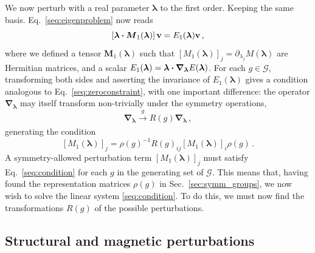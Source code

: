 We now perturb with a real parameter $\boldsymbol{\lambda}$ to the first order. Keeping the same basis. Eq.~\eqref{seq:eigenproblem} now reads
\begin{equation} \label{seq:perteq}
\left[\boldsymbol{\lambda} \vdot \boldsymbol{M}_{1}(\boldsymbol{\lambda})\right] \vb{v} = E_1(\boldsymbol{\lambda}) \vb{v}\,,
\end{equation}
where we defined a tensor $\boldsymbol{M}_{1}(\boldsymbol{\lambda})$ such that $\left[M_1(\boldsymbol{\lambda})\right]_j = \partial_{\lambda_j} M(\boldsymbol{\lambda} )$ are Hermitian matrices, and a scalar $E_{1}(\boldsymbol{\lambda}) = \boldsymbol{\lambda} \vdot \boldsymbol{\nabla_\lambda} E(\boldsymbol{\lambda} )$. 
For each $g \in \mathcal{G}$, transforming both sides and asserting the invariance of $E_1(\boldsymbol{\lambda})$ gives a condition analogous to Eq.~\eqref{seq:zeroconstraint}, with one important difference: the operator $\boldsymbol{\nabla}_{\boldsymbol{\lambda}}$ may itself transform non-trivially under the symmetry operations,
\begin{equation}
\boldsymbol{\nabla}_{\boldsymbol{\lambda}} \xrightarrow[]{g} R(g)   \boldsymbol{\nabla}_{\boldsymbol{\lambda}}\,,
\end{equation}
generating the condition
\begin{equation} \label{seq:condition}
\left[M_1(\boldsymbol{\lambda}) \right]_j =  \rho(g)^{-1} R(g)_{ij} \left[M_1(\boldsymbol{\lambda} )\right]_i \rho(g) \, .
\end{equation}
A symmetry-allowed perturbation term $\left[M_1(\boldsymbol{\lambda}) \right]_j$ must satisfy Eq.~\eqref{seq:condition} for each $g$ in the generating set of $\mathcal{G}$. This means that, having found the representation matrices $\rho(g)$ in Sec.~\ref{sec:symm_groups}, we now wish to solve the linear system \eqref{seq:condition}. To do this, we must now find the transformations $R(g)$ of the possible perturbations. 

\subsection{Structural and magnetic perturbations} \label{sec:symm_eng} 

